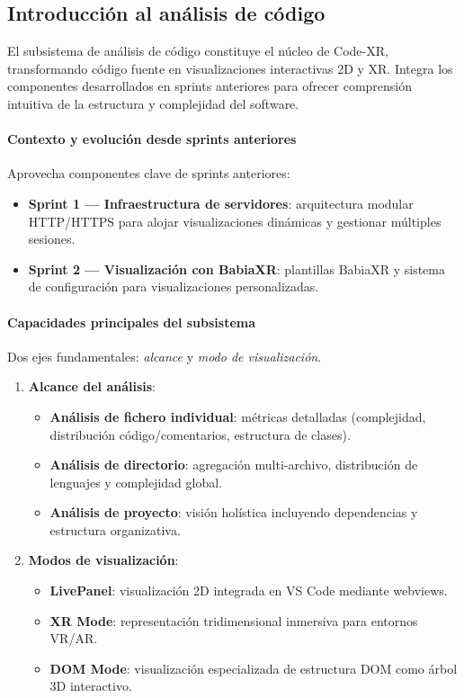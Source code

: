 \documentclass[a4paper, 12pt]{book}
\begin{document}
\subsection{Introducción al análisis de código}
\label{sec:intro-analisis}

El subsistema de análisis de código constituye el núcleo de Code-XR, transformando código fuente en visualizaciones interactivas 2D y XR. Integra los componentes desarrollados en sprints anteriores para ofrecer comprensión intuitiva de la estructura y complejidad del software.

\paragraph{Contexto y evolución desde sprints anteriores}
Aprovecha componentes clave de sprints anteriores:

\begin{itemize}
  \item \textbf{Sprint 1 — Infraestructura de servidores}: arquitectura modular HTTP/HTTPS para alojar visualizaciones dinámicas y gestionar múltiples sesiones.
  \item \textbf{Sprint 2 — Visualización con BabiaXR}: plantillas BabiaXR y sistema de configuración para visualizaciones personalizadas.
\end{itemize}

\paragraph{Capacidades principales del subsistema}  
Dos ejes fundamentales: \emph{alcance} y \emph{modo de visualización}.

\begin{enumerate}
  \item \textbf{Alcance del análisis}:
    \begin{itemize}
      \item \textbf{Análisis de fichero individual}: métricas detalladas (complejidad, distribución código/comentarios, estructura de clases).
      \item \textbf{Análisis de directorio}: agregación multi-archivo, distribución de lenguajes y complejidad global.
      \item \textbf{Análisis de proyecto}: visión holística incluyendo dependencias y estructura organizativa.
    \end{itemize}
  
  \item \textbf{Modos de visualización}:
    \begin{itemize}
      \item \textbf{LivePanel}: visualización 2D integrada en VS Code mediante webviews.
      \item \textbf{XR Mode}: representación tridimensional inmersiva para entornos VR/AR.
      \item \textbf{DOM Mode}: visualización especializada de estructura DOM como árbol 3D interactivo.
    \end{itemize}
    
\end{enumerate}
\end{document}
